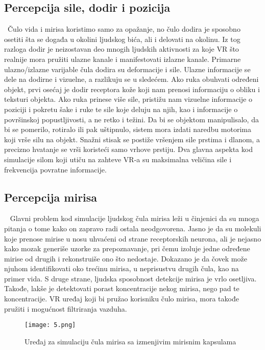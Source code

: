 \documentclass[a4paper]{article}
\begin{document}
\subsection{Percepcija sile, dodir i pozicija}
\label{subsec:percepcija sile, dodir i pozicija}
\indent~Čulo vida i mirisa koristimo samo za opažanje, no čulo dodira je sposobno osetiti šta se događa u okolini ljudskog bića, ali i delovati na okolinu. Iz tog  razloga dodir je neizostavan  deo mnogih ljudskih aktivnosti za koje VR što realnije mora pružiti ulazne kanale i manifestovati izlazne kanale. Primarne ulazno/izlazne varijable čula dodira su deformacije i sile. Ulazne informacije se dele na dodirne i vizuelne, a razlikuju se u sledećem. Ako ruka obuhvati određeni objekt, prvi osećaj je dodir receptora kože koji nam prenosi informaciju o obliku i teksturi objekta. Ako ruka prinese više sile, pristižu nam vizuelne informacije o poziciji i pokretu šake i ruke te sile koje deluju na njih, kao i informacije o površinskoj popustljivosti, a ne retko i težini. Da bi se objektom manipulisalo, da bi se pomerilo, rotiralo ili pak uštipnulo, sistem mora izdati naredbu motorima koji vrše silu na objekt. Snažni stisak se postiže vršenjem sile prstima i dlanom, a precizno hvatanje se vrši koristeći samo vrhove prstiju. Dva glavna aspekta kod simulacije silom koji utiču na zahteve VR-a su maksimalna veličina sile i frekvencija povratne informacije.

\subsection{Percepcija mirisa}
\label{subsec:percepcija mirisa}
\indent~ Glavni problem kod simulacije ljudskog čula mirisa leži u činjenici da su mnoga pitanja o tome kako on zapravo radi ostala neodgovorena. Jasno je da su molekuli koje prenose mirise u nosu uhvaćeni od strane receptorskih neurona, ali je nejasno kako mozak generiše uzorke za prepoznavanje, pri čemu izoluje jedne određene mirise od drugih i rekonstruiše ono što nedostaje. Dokazano je  da čovek može njuhom identifikovati oko trećinu mirisa, u neprisustvu drugih čula, kao na primer vida. S druge strane, ljudska sposobnost detekcije mirisa je vrlo osetljiva. Takođe, lakše je detektovati porast koncentracije nekog mirisa, nego pad te koncentracije. VR uređaj koji bi pružao korisniku čulo mirisa, mora takođe pružiti i mogućnost filtriranja vazduha.\cite{1}
\begin{figure}[h!]
\begin{center}
\texttt{[image: 5.png]}
\label{5}
\end{center}
\caption{Uređaj za simulaciju čula mirisa sa izmenjivim mirisnim kapsulama}
\end{figure}
\end{document}
